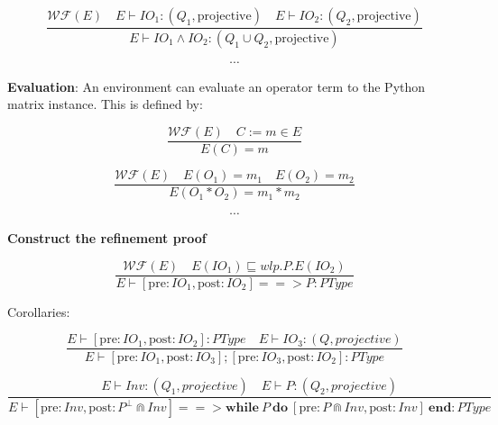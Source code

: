 \documentclass{article}
\begin{document}
$$
\frac{\mathcal{WF}(E)\quad E \vdash IO_1 : (Q_1, \text{projective}) \quad E \vdash IO_2 : (Q_2, \text{projective})}{E \vdash IO_1 \wedge IO_2 : (Q_1 \cup Q_2, \text{projective})}
$$

$$
\cdots
$$

\textbf{Evaluation}: An environment can evaluate an operator term to the Python matrix instance. This is defined by:

$$
\frac{\mathcal{WF}(E)\quad C:=m \in E}{E(C) = m}
$$

$$
\frac{\mathcal{WF}(E)\quad E(O_1) = m_1\quad E(O_2) = m_2 }{E(O_1 * O_2) = m_1 * m_2}
$$

$$
\cdots
$$

\textbf{Construct the refinement proof}

$$
\frac{\mathcal{WF}(E)\quad E(IO_1) \sqsubseteq wlp.P.E(IO_2)}{E \vdash [\mathrm{pre} : IO_1, \mathrm{post} : IO_2] ==> P : PType}
$$

Corollaries:

$$
\frac{E \vdash [\mathrm{pre} : IO_1, \mathrm{post} : IO_2]:PType \quad E \vdash IO_3 : (Q, projective)}{E \vdash [\mathrm{pre} : IO_1, \mathrm{post} : IO_3]; [\mathrm{pre} : IO_3, \mathrm{post} : IO_2] : PType}
$$

$$
\frac{E \vdash Inv : (Q_1, projective) \quad E \vdash P : (Q_2, projective)}{E \vdash [\mathrm{pre} : Inv, \mathrm{post} : P^\bot \Cap Inv]==> \mathbf{while}\ P\ \mathbf{do}\ [\mathrm{pre} : P \Cap Inv, \mathrm{post} : Inv]\ \mathbf{end} : PType }
$$
\end{document}

